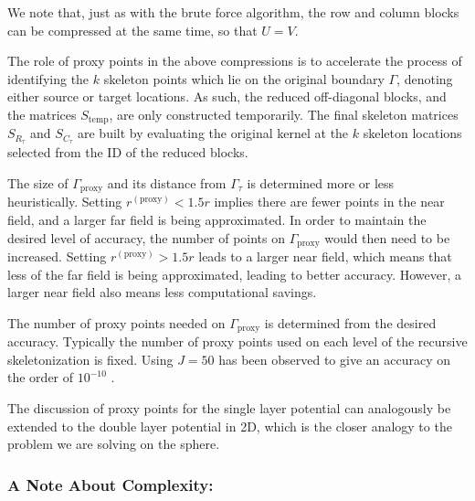 \documentclass{sfuthesis}
\begin{document}
We note that, just as with the brute force algorithm, the row and column blocks can be compressed at the same time, so that $U=V$. 

The role of proxy points in the above compressions is to accelerate the process of identifying the $k$ skeleton points which lie on the original boundary $\Gamma$, denoting either source or target locations. As such, the reduced off-diagonal blocks, and the matrices $S_{\text{temp}}$, are only constructed temporarily. The final skeleton matrices $S_{R_\tau}$ and $S_{C_\tau}$ are built  by evaluating the original kernel at the $k$ skeleton locations selected from the ID of the reduced blocks.  

The size of $\Gamma_{\text{proxy}}$ and its distance from $\Gamma_{\tau}$ is determined more or less heuristically. Setting $r^{(\text{proxy})}<1.5r$ implies there are fewer points in the near field, and a larger far field is being approximated. In order to maintain the desired level of accuracy, the number of points on $\Gamma_{\text{proxy}}$ would then need to be increased. Setting $r^{(\text{proxy})}>1.5r$ leads to a larger near field, which means that less of the far field is being approximated, leading to better accuracy. However, a larger near field also means less computational savings. 

The number of proxy points needed on $\Gamma_{\text{proxy}}$ is determined from the desired accuracy. Typically the number of proxy points used on each level of the recursive skeletonization is fixed. Using $J=50$ has been observed to give an accuracy on the order of $10^{-10}$ \cite{GillYoungMart2012}. 

The discussion of proxy points for the single layer potential can analogously be extended to the double layer potential in 2D, which is the closer analogy to the problem we are solving on the sphere. 


\subsubsection{A Note About Complexity:}
\end{document}
